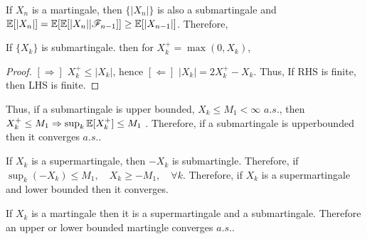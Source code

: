 \documentclass[all-lectures.tex]{subfiles}
\begin{document}
If $X_n$ is a martingale, then $\{|X_n|\}$ is also a submartingale and $\mathbb{E}[|X_n|] = \mathbb{E}[\mathbb{E}[|X_n||\mathscr{F}_{n-1}]] \ge \mathbb{E}[|X_{n-1}|]$.
Therefore,
\\
\begin{lem}
If $\{X_k\}$ is submartingale. then for $X^+_k = \max(0, X_k)$,
\end{lem}
\begin{proof}
$[\Rightarrow]$
$X^+_k \le |X_k|$, hence
$[\Leftarrow]$
$|X_k| = 2X^+_k - X_k$.
Thus,
If RHS is finite, then LHS is finite.
\end{proof}
Thus, if a submartingale is upper bounded, $X_k \le  M_1 < \infty$ $a.s.$, then
$X^+_k \le M_1  \Rightarrow \sup_k \mathbb{E}[X^+_k] \le M_1$ .
Therefore, if a submartingale is upperbounded then it converges $a.s.$.

If $X_k$ is a supermartingale, then $-X_k$ is submartingle.
Therefore, if $\sup_k (-X_k) \le M_1, \quad X_k \ge -M_1, \quad \forall k$.
Therefore, if $X_k$ is a supermartingale and lower bounded then it converges.

If $X_k$ is a martingale then it is a supermartingale and a submartingale. Therefore an upper or lower bounded martingle converges $a.s.$.
\end{document}
